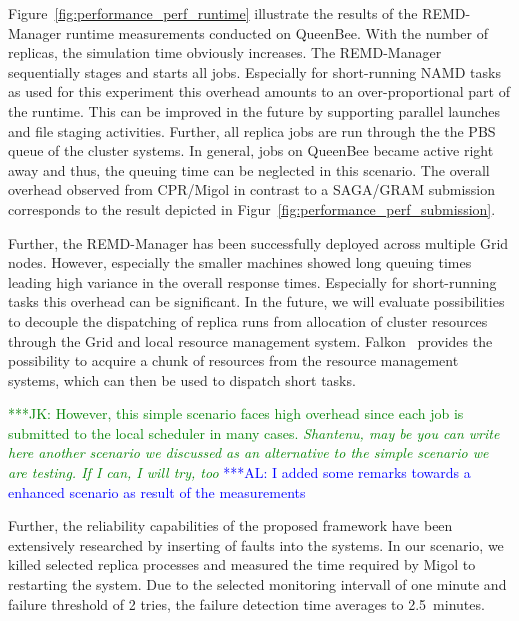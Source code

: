 \documentclass[times, 10pt, twocolumn]{article}
\newcommand{\kimnote}[1]{ {\textcolor{green} { ***JK: #1 }}}
\newcommand{\alnote}[1]{ {\textcolor{blue} { ***AL: #1 }}}
\newcommand{\kimnote}[1]{}
\newcommand{\alnote}[1]{}
\begin{document}
Figure~\ref{fig:performance_perf_runtime} illustrate the results of
the REMD-Manager runtime measurements conducted on QueenBee. With the
number of replicas, the simulation time obviously increases.  The
REMD-Manager sequentially stages and starts all jobs.  Especially for
short-running NAMD tasks as used for this experiment this overhead
amounts to an over-proportional part of the runtime. This can be
improved in the future by supporting parallel launches and file
staging activities.  Further, all replica jobs are run through the the
PBS queue of the cluster systems.  In general, jobs on QueenBee became
active right away and thus, the queuing time can be neglected in this
scenario.  The overall overhead observed from CPR/Migol in contrast to
a SAGA/GRAM submission corresponds to the result depicted in
Figur~\ref{fig:performance_perf_submission}.


Further, the REMD-Manager has been successfully deployed across
multiple Grid nodes.  However, especially the smaller machines showed
long queuing times leading high variance in the overall response
times. Especially for short-running tasks this overhead can be
significant. In the future, we will evaluate possibilities to decouple
the dispatching of replica runs from allocation of cluster resources
through the Grid and local resource management
system. Falkon~\cite{1362680} provides the possibility to acquire a
chunk of resources from the resource management systems, which can
then be used to dispatch short tasks.

\kimnote{However, this simple scenario faces high overhead since each
  job is submitted to the local scheduler in many cases. \it
  Shantenu, may be you can write here another scenario we discussed
  as an alternative to the simple scenario we are testing.  If I can,
  I will try, too }            
\alnote{I added some remarks towards a enhanced scenario as result of the measurements}  

Further, the reliability capabilities of the proposed framework have
been extensively researched by inserting of faults into the
systems. In our scenario, we killed selected replica processes and
measured the time required by Migol to restarting the system.  Due to
the selected monitoring intervall of one minute and failure threshold
of 2 tries, the failure detection time averages to 2.5\, minutes.
\end{document}
